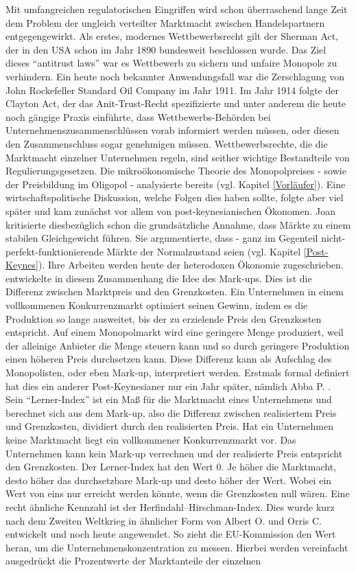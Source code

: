 Mit umfangreichen regulatorischen Eingriffen wird schon überraschend lange Zeit dem Problem der ungleich verteilter Marktmacht zwischen Handelspartnern  entgegengewirkt. Als erstes, modernes Wettbewerbsrecht gilt der Sherman Act, der in den USA schon im Jahr 1890 bundesweit beschlossen wurde. Das Ziel dieses "`antitrust laws"' war es Wettbewerb zu sichern und unfaire Monopole zu verhindern. Ein heute noch bekannter Anwendungsfall war die Zerschlagung von John Rockefeller Standard Oil Company im Jahr 1911. Im Jahr 1914 folgte der Clayton Act, der das Anit-Trust-Recht spezifizierte und unter anderem die heute noch gängige Praxis einführte, dass Wettbewerbs-Behörden bei Unternehmenszusammenschlüssen vorab informiert werden müssen, oder diesen den Zusammenschluss sogar genehmigen müssen. Wettbewerbsrechte, die die Marktmacht einzelner Unternehmen regeln, sind seither wichtige Bestandteile von Regulierungsgesetzen. Die mikroökonomische Theorie des Monopolpreises - sowie der Preisbildung im Oligopol - analysierte bereits \textcite{Cournot1838} (vgl. Kapitel \ref{Vorläufer}). Eine wirtschaftspolitische Diskussion, welche Folgen dies haben sollte, folgte aber viel später und kam zunächst vor allem von post-keynesianischen Ökonomen. Joan \textcite{Robinson1933} kritisierte diesbezüglich schon die grundsätzliche Annahme, dass Märkte zu einem stabilen Gleichgewicht führen. Sie argumentierte, dass - ganz im Gegenteil nicht-perfekt-funktionierende Märkte der Normalzustand seien (vgl. Kapitel \ref{Post-Keynes}). Ihre Arbeiten werden heute der heterodoxen Ökonomie zugeschrieben. \textcite{Robinson1933} entwickelte in diesem Zusammenhang die Idee des Mark-ups. Dies ist die Differenz zwischen Marktpreis und den Grenzkosten. Ein Unternehmen in einem vollkommenen Konkurrenzmarkt optimiert seinen Gewinn, indem es die Produktion so lange ausweitet, bis der zu erzielende Preis den Grenzkosten entspricht. Auf einem Monopolmarkt wird eine geringere Menge produziert, weil der alleinige Anbieter die Menge steuern kann und so durch geringere Produktion einen höheren Preis durchsetzen kann. Diese Differenz kann als Aufschlag des Monopolisten, oder eben Mark-up, interpretiert werden. Erstmals formal definiert hat dies ein anderer Post-Keynesianer nur ein Jahr später, nämlich Abba P. \textcite{Lerner1934}. Sein "`Lerner-Index"' ist ein Maß für die Marktmacht eines Unternehmens und berechnet sich aus dem Mark-up, also die Differenz zwischen realisiertem Preis und Grenzkosten, dividiert durch den realisierten Preis. Hat ein Unternehmen keine Marktmacht liegt ein vollkommener Konkurrenzmarkt vor. Das Unternehmen kann kein Mark-up verrechnen und der realisierte Preis entspricht den Grenzkosten. Der Lerner-Index hat den Wert 0. Je höher die Marktmacht, desto höher das durchsetzbare Mark-up und desto höher der Wert. Wobei ein Wert von eins nur erreicht werden könnte, wenn die Grenzkosten null wären. Eine recht ähnliche Kennzahl ist der Herfindahl–Hirschman-Index. Dies wurde kurz nach dem Zweiten Weltkrieg in ähnlicher Form von Albert O. \textcite{Hirschman1945} und Orris C. \textcite{Herfindahl1950} entwickelt und noch heute angewendet. So zieht die EU-Kommission den Wert heran, um die Unternehmenskonzentration zu messen. Hierbei werden vereinfacht ausgedrückt die Prozentwerte der Marktanteile der einzelnen 